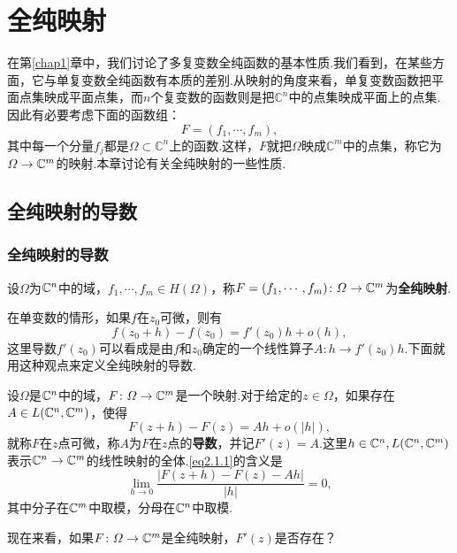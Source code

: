 \chapter{全纯映射\label{chap2}}
在第\ref{chap1}章中，我们讨论了多复变数全纯函数的基本性质.我们看到，在某些方面，它与单复变数全纯函数有本质的差别.从映射的角度来看，单复变数函数把平面点集映成平面点集，而$n$个复变数的函数则是把$\mathbb{C}^n$中的点集映成平面上的点集.因此有必要考虑下面的函数组：
\[F=(f_1,\cdots,f_m),\]
其中每一个分量$f_j$都是$\Omega\subset\mathbb{C}^n$上的函数.这样，$F$就把$\Omega$映成$\mathbb{C}^m$中的点集，称它为$\varOmega\to\mathbb C^m$的映射.本章讨论有关全纯映射的一些性质.
\section{全纯映射的导数\label{sec2.1}}
\subsection{全纯映射的导数}
\begin{definition}\label{def2.1.1}
	设$\Omega$为$\mathbb C^n$中的域，$f_1,\cdots,f_m\in H(\Omega)$，称$F=(f_1,\cdots,f_m)\colon\varOmega\to\mathbb C^m$为\textbf{全纯映射}.
\end{definition}
在单变数的情形，如果$f$在$z_0$可微，则有
\[f(z_0+h)-f(z_0)=f'(z_0)h+o(h),\]
这里导数$f'(z_0)$可以看成是由$f$和$z_0$确定的一个线性算子$A\colon h\to f'(z_0)h$.下面就用这种观点来定义全纯映射的导数.
\begin{definition}\label{def2.1.2}
	设$\Omega$是$\mathbb C^n$中的域，$F\colon\varOmega\to\mathbb C^m$是一个映射.对于给定的$z\in\Omega$，如果存在$A\in L(\mathbb C^n,\mathbb C^m)$，使得
	\begin{equation}\label{eq2.1.1}
		F(z+h)-F(z)=Ah+o(|h|),
	\end{equation}
就称$F$在$z$点可微，称$A$为$F$在$z$点的\textbf{导数}，并记$F'(z)=A$.这里$h\in\mathbb C^n,L(\mathbb C^n,\mathbb C^m)$表示$\mathbb C^n\to\mathbb C^m$的线性映射的全体.\eqref{eq2.1.1}的含义是
\[\lim_{h\to0}\frac{\left|F(z+h)-F(z)-Ah\right|}{|h|}=0,\]
其中分子在$\mathbb C^m$中取模，分母在$\mathbb C^n$中取模.
\end{definition}
现在来看，如果$F\colon\varOmega\to\mathbb C^m$是全纯映射，$F'(z)$是否存在？

